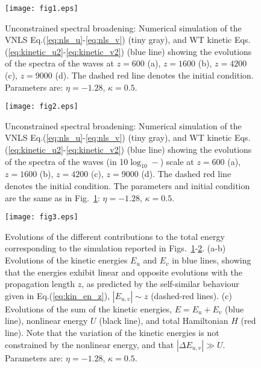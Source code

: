\documentclass[pra,twocolumn,showpacs,preprintnumbers,amsmath,amssymb]{revtex4}
\begin{document}
\begin{center}
\begin{figure}[t]
\texttt{[image: fig1.eps]}
\caption{Unconstrained spectral broadening: Numerical simulation of the VNLS Eq.(\ref{eq:nls_u}-\ref{eq:nls_v}) (tiny gray), and WT kinetic Eqs.(\ref{eq:kinetic_u2}-\ref{eq:kinetic_v2}) (blue line) showing the evolutions of the spectra of the waves at $z=600$ (a), $z=1600$ (b), $z=4200$ (c), $z=9000$ (d). 
The dashed red line denotes the initial condition.
Parameters are: 
$\eta = -1.28$, $\kappa=0.5$.}
\label{fig:evol_nscale}
\end{figure}
\end{center}

\begin{center}
\begin{figure}[t]
\texttt{[image: fig2.eps]}
\caption{Unconstrained spectral broadening: Numerical simulation of the VNLS Eq.(\ref{eq:nls_u}-\ref{eq:nls_v}) (tiny gray), and WT kinetic Eqs.(\ref{eq:kinetic_u2}-\ref{eq:kinetic_v2}) (blue line) showing the evolutions of the spectra of the waves (in 10$\log_{10}-$) scale at $z=600$ (a), $z=1600$ (b), $z=4200$ (c), $z=9000$ (d). 
The dashed red line denotes the initial condition.
The parameters and initial condition are the same as in Fig.~\ref{fig:evol_nscale}: 
$\eta = -1.28$, $\kappa=0.5$.}
\label{fig:evol_logscale}
\end{figure}
\end{center}



\begin{center}
\begin{figure}[t]
\texttt{[image: fig3.eps]}
\caption{Evolutions of the different contributions to the total energy corresponding to the simulation reported in Figs.~\ref{fig:evol_nscale}-\ref{fig:evol_logscale}.
(a-b) Evolutions of the kinetic energies $E_u$ and $E_v$ in blue lines, showing that the energies exhibit linear and opposite evolutions with the propagation length $z$, as predicted by the self-similar behaviour given in Eq.(\ref{eq:kin_en_z}),  $|E_{u,v}| \sim z$ (dashed-red lines).
(c) Evolutions of the sum of the kinetic energies, $E=E_u+E_v$ (blue line),  nonlinear energy $U$ (black line), and total Hamiltonian $H$ (red line).
Note that the variation of the kinetic energies is not constrained by the nonlinear energy, and that $|\Delta E_{u,v}| \gg U$.
Parameters are: $\eta = -1.28$, $\kappa=0.5$.}
\label{fig:ham}
\end{figure}
\end{center}
\end{document}
